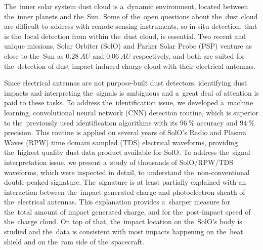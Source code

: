 The~inner solar system dust cloud is a~dynamic environment, located between the~inner planets and the~Sun. Some of the~open questions about the~dust cloud are difficult to address with remote sensing instruments, so in-situ detection, that is the~local detection from within the~dust cloud, is essential. Two recent and unique missions, Solar Orbiter (SolO) and Parker Solar Probe (PSP) venture as close to the~Sun as $\SI{0.28}{AU}$ and $\SI{0.06}{AU}$ respectively, and both are suited for the~detection of dust impact induced charge cloud with their electrical antennas.   

Since electrical antennas are not purpose-built dust detectors, identifying dust impacts and interpreting the~signals is ambiguous and a~great deal of attention is paid to these tasks. To address the~identification issue, we developed a~machine learning, convolutional neural network (CNN) detection routine, which is superior to the~previously used identification algorithms with its $\SI{96}{\%}$ accuracy and $\SI{94}{\%}$ precision. This routine is applied on several years of SolO's Radio and Plasma Waves (RPW) time domain sampled (TDS) electrical waveforms, providing the~highest quality dust data product available for SolO. To address the~signal interpretation issue, we present a~study of thousands of SolO/RPW/TDS waveforms, which were inspected in detail, to understand the~non-conventional double-peaked signature. The~signature is at least partially explained with an interaction between the~impact generated charge and photoelectron sheath of the~electrical antennas. This explanation provides a~sharper measure for the~total amount of impact generated charge, and for the~post-impact speed of the~charge cloud. On top of that, the~impact location on the~SolO's body is studied and the~data is consistent with most impacts happening on the~heat shield and on the~ram side of the~spacecraft.  

